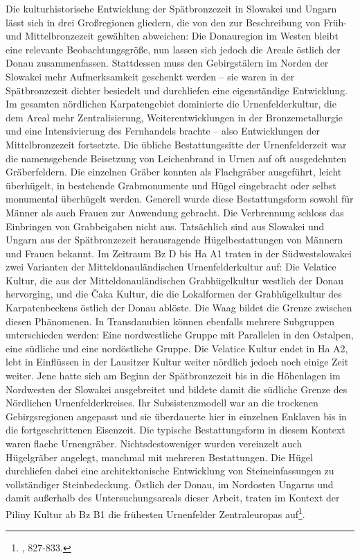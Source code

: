 \documentclass[openany,twoside,twocolumn]{book}
\let\rmarkdownfootnote\footnote%
\def\footnote{\protect\rmarkdownfootnote}
\begin{document}
Die kulturhistorische Entwicklung der Spätbronzezeit in Slowakei und
Ungarn lässt sich in drei Großregionen gliedern, die von den zur
Beschreibung von Früh- und Mittelbronzezeit gewählten abweichen: Die
Donauregion im Westen bleibt eine relevante Beobachtungsgröße, nun
lassen sich jedoch die Areale östlich der Donau zusammenfassen.
Stattdessen muss den Gebirgstälern im Norden der Slowakei mehr
Aufmerksamkeit geschenkt werden -- sie waren in der Spätbronzezeit
dichter besiedelt und durchliefen eine eigenständige Entwicklung. Im
gesamten nördlichen Karpatengebiet dominierte die Urnenfelderkultur, die
dem Areal mehr Zentralisierung, Weiterentwicklungen in der
Bronzemetallurgie und eine Intensivierung des Fernhandels brachte --
also Entwicklungen der Mittelbronzezeit fortsetzte. Die übliche
Bestattungssitte der Urnenfelderzeit war die namensgebende Beisetzung
von Leichenbrand in Urnen auf oft ausgedehnten Gräberfeldern. Die
einzelnen Gräber konnten als Flachgräber ausgeführt, leicht überhügelt,
in bestehende Grabmonumente und Hügel eingebracht oder selbst monumental
überhügelt werden. Generell wurde diese Bestattungsform sowohl für
Männer als auch Frauen zur Anwendung gebracht. Die Verbrennung schloss
das Einbringen von Grabbeigaben nicht aus. Tatsächlich sind aus Slowakei
und Ungarn aus der Spätbronzezeit herausragende Hügelbestattungen von
Männern und Frauen bekannt. Im Zeitraum Bz D bis Ha A1 traten in der
Südwestslowakei zwei Varianten der Mitteldonauländischen
Urnenfelderkultur auf: Die Velatice Kultur, die aus der
Mitteldonauländischen Grabhügelkultur westlich der Donau hervorging, und
die Čaka Kultur, die die Lokalformen der Grabhügelkultur des
Karpatenbeckens östlich der Donau ablöste. Die Waag bildet die Grenze
zwischen diesen Phänomenen. In Transdanubien können ebenfalls mehrere
Subgruppen unterschieden werden: Eine nordwestliche Gruppe mit
Parallelen in den Ostalpen, eine südliche und eine nordöstliche Gruppe.
Die Velatice Kultur endet in Ha A2, lebt in Einflüssen in der Lausitzer
Kultur weiter nördlich jedoch noch einige Zeit weiter. Jene hatte sich
am Beginn der Spätbronzezeit bis in die Höhenlagen im Nordwesten der
Slowakei ausgebreitet und bildete damit die südliche Grenze des
Nördlichen Urnenfelderkreises. Ihr Subsistenzmodell war an die trockenen
Gebirgsregionen angepasst und sie überdauerte hier in einzelnen Enklaven
bis in die fortgeschrittenen Eisenzeit. Die typische Bestattungsform in
diesem Kontext waren flache Urnengräber. Nichtsdestoweniger wurden
vereinzelt auch Hügelgräber angelegt, manchmal mit mehreren
Bestattungen. Die Hügel durchliefen dabei eine architektonische
Entwicklung von Steineinfassungen zu vollständiger Steinbedeckung.
Östlich der Donau, im Nordosten Ungarns und damit außerhalb des
Untersuchungsareals dieser Arbeit, traten im Kontext der Piliny Kultur
ab Bz B1 die frühesten Urnenfelder Zentraleuropas auf\footnote{\textcite{markova_slovakia_2013},
  827-833.}.
\end{document}
